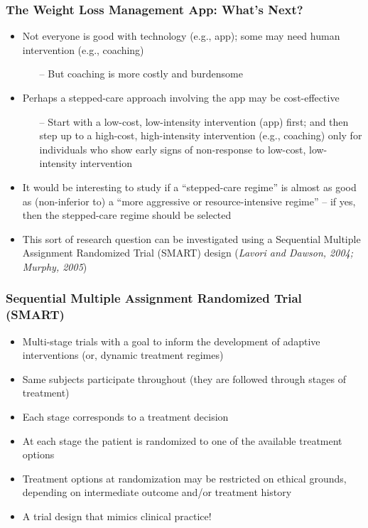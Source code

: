 \documentclass[10pt,xcolor=dvipsnames]{beamer}
\begin{document}
\begin{frame}
\frametitle{The Weight Loss Management App: What's Next?}
\begin{itemize}
\item Not everyone is good with technology (e.g., app); some may need human intervention (e.g., coaching)
\smallskip
\begin{itemize}
\item[--] But coaching is more \alert{costly and burdensome}
\end{itemize}
\bigskip
\item Perhaps a \alert{stepped-care approach} involving the app may be \alert{cost-effective}
\smallskip
\begin{itemize}
\item[--] Start with a low-cost, low-intensity intervention (app) first; and then \alert{step up to a high-cost, high-intensity intervention (e.g., coaching) only for individuals who show early signs of non-response} to low-cost, low-intensity intervention
\end{itemize}
\bigskip
\item It would be interesting to study if a ``stepped-care regime'' is almost as good as (\alert{non-inferior} to) a ``more aggressive or resource-intensive regime'' -- if yes, then the stepped-care regime should be selected 
\bigskip
\item This sort of research question can be investigated using a \alert{Sequential Multiple Assignment Randomized Trial (SMART)} design (\emph{Lavori and Dawson, 2004; Murphy, 2005})
\end{itemize}
\end{frame}



\begin{frame}%
\frametitle{Sequential Multiple Assignment Randomized Trial (SMART)}
\begin{itemize}
\item \alert{Multi-stage} trials with a goal to inform the development of {\color{blue}adaptive interventions} (or, {\color{blue}dynamic treatment regimes})
\bigskip
\item  Same subjects participate \alert{throughout} (they are followed through stages of treatment)
\bigskip
\item Each stage corresponds to a treatment decision
\bigskip
\item At each stage the patient is \alert{randomized} to one of the available treatment options
\bigskip
\item Treatment options at randomization may be \alert{restricted} on ethical grounds, depending on intermediate outcome and/or treatment history
\bigskip
\item A trial design that mimics clinical practice!
\end{itemize}
\end{frame}
\end{document}
